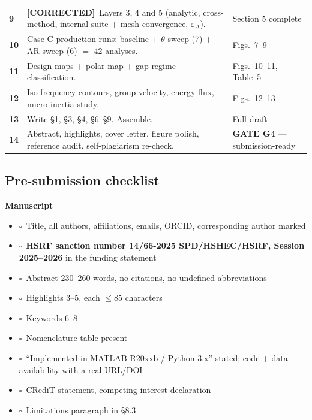\documentclass[11pt,a4paper]{article}
\newcommand{\COR}{{\color{corcol}\textbf{[CORRECTED]}}}
\newcommand{\chk}{$\square$~}
\begin{document}
\begin{longtable}{@{}>{\bfseries}p{1.5cm} L{8.2cm} L{4.6cm}@{}}
9 & \COR\ Layers 3, 4 and 5 (analytic, cross-method, internal suite + mesh convergence, $\varepsilon_\Delta$). & Section 5 complete \\
10 & Case C production runs: baseline + $\theta$ sweep (7) + AR sweep (6) $=$ 42 analyses. & Figs.~7--9 \\
11 & Design maps + polar map + gap-regime classification. & Figs.~10--11, Table~5 \\
12 & Iso-frequency contours, group velocity, energy flux, micro-inertia study. & Figs.~12--13 \\
13 & Write \S1, \S3, \S4, \S6--\S9. Assemble. & Full draft \\
14 & Abstract, highlights, cover letter, figure polish, reference audit, self-plagiarism re-check. & \textbf{GATE G4} --- submission-ready \\
\bottomrule
\end{longtable}

\subsection{Pre-submission checklist}

\textbf{Manuscript}
\begin{itemize}
\item \chk Title, all authors, affiliations, emails, ORCID, corresponding author marked
\item \chk \textbf{HSRF sanction number 14/66-2025 SPD/HSHEC/HSRF, Session 2025--2026} in the funding statement
\item \chk Abstract 230--260 words, no citations, no undefined abbreviations
\item \chk Highlights 3--5, each $\le$85 characters
\item \chk Keywords 6--8
\item \chk Nomenclature table present
\item \chk ``Implemented in MATLAB R20xxb / Python 3.x'' stated; code + data availability with a real URL/DOI
\item \chk CRediT statement, competing-interest declaration
\item \chk Limitations paragraph in \S8.3
\end{itemize}
\end{document}
